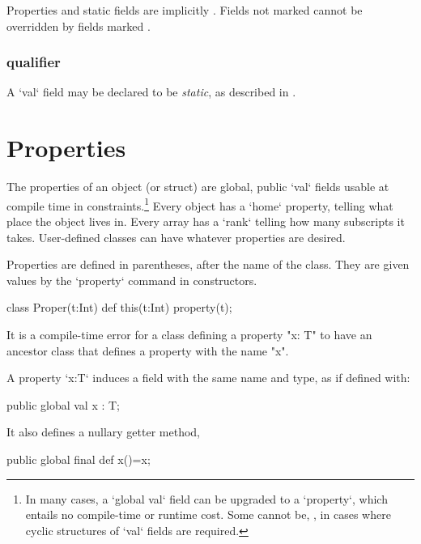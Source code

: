 Properties and static fields are implicitly .
Fields not marked  cannot be overridden by fields marked
.



\subsubsection{ qualifier}

A \xcd`val` field may be declared to be {\em static}, as described in
. 

\section{Properties}
\label{PropertiesInClasses}

The properties of an object (or struct) are global, public \xcd`val` fields
usable at compile time in constraints.\footnote{In many cases, a 
\xcd`global val` field can be upgraded to a \xcd`property`, which 
entails no compile-time or runtime cost.  Some cannot be, \eg, in cases where
cyclic structures of \xcd`val` fields are required.} Every
object has a \xcd`home` property, 
telling what place the object lives in. Every array has a \xcd`rank` telling
how many subscripts it takes.  User-defined classes can have whatever
properties are desired. 

Properties are defined in parentheses, after the name of the class.  They are
given values by the \xcd`property` command in constructors.
\begin{xten}
class Proper(t:Int) {
  def this(t:Int) {property(t);}
}
\end{xten}
%


\begin{staticrule*}
It is a compile-time error for a class
defining a property \xcd"x: T" to have an ancestor class that defines
a property with the name \xcd"x".  
\end{staticrule*}

A property \xcd`x:T` induces a field with the same name and type, 
as if defined with: 
\begin{xten}
public global val x : T;
\end{xten} 
\noindent It also defines a nullary getter method, 
\begin{xten}
public global final def x()=x;
\end{xten}

